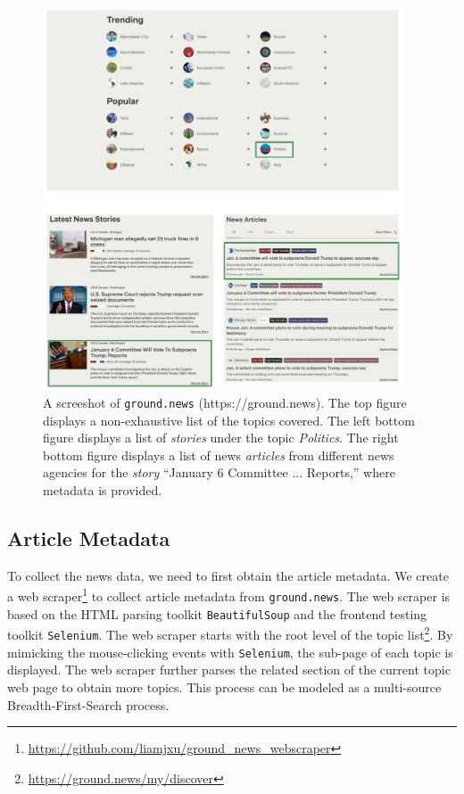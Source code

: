 \begin{figure}[ht!]
    \centering
    \includegraphics[width=0.95\textwidth]{img/ground_news.png}
    \caption{A screeshot of \texttt{ground.news} (https://ground.news). The top figure displays a non-exhaustive list of the topics covered. The left bottom figure displays a list of \textit{stories} under the topic \textit{Politics}. The right bottom figure displays a list of news \textit{articles} from different news agencies for the \textit{story} ``January 6 Committee ... Reports,'' where metadata is provided.}
    \label{fig:ground-news}
\end{figure}

\subsection{Article Metadata}
\label{article-metadata}
To collect the news data, we need to first obtain the article metadata. We create a web scraper\footnote{\url{https://github.com/liamjxu/ground\_news\_webscraper}} to collect article metadata from \texttt{ground.news}. The web scraper is based on the HTML parsing toolkit \texttt{BeautifulSoup} and the frontend testing toolkit \texttt{Selenium}. The web scraper starts with the root level of the topic list\footnote{\url{https://ground.news/my/discover}}. By mimicking the mouse-clicking events with \texttt{Selenium}, the sub-page of each topic is displayed. The web scraper further parses the related section of the current topic web page to obtain more topics. This process can be modeled as a multi-source Breadth-First-Search process.

